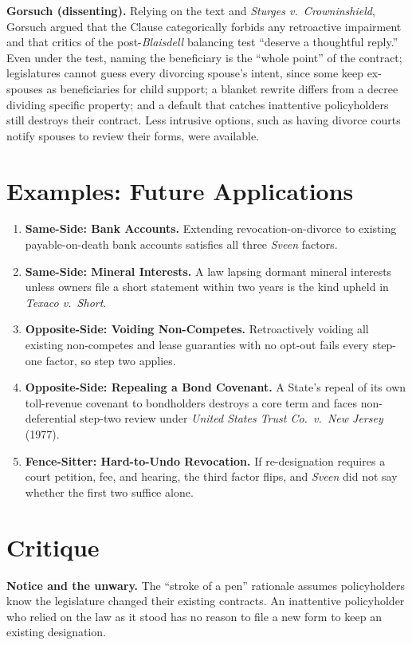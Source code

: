 \documentclass[12pt]{article}
\begin{document}
\textbf{Gorsuch (dissenting).} Relying on the text and \textit{Sturges v.\ Crowninshield}, Gorsuch argued that the Clause categorically forbids any retroactive impairment and that critics of the post-\textit{Blaisdell} balancing test ``deserve a thoughtful reply.'' Even under the test, naming the beneficiary is the ``whole point'' of the contract; legislatures cannot guess every divorcing spouse's intent, since some keep ex-spouses as beneficiaries for child support; a blanket rewrite differs from a decree dividing specific property; and a default that catches inattentive policyholders still destroys their contract. Less intrusive options, such as having divorce courts notify spouses to review their forms, were available.

\section{Examples: Future Applications}

\begin{enumerate}
\item \textbf{Same-Side: Bank Accounts.} Extending revocation-on-divorce to existing payable-on-death bank accounts satisfies all three \textit{Sveen} factors.
\item \textbf{Same-Side: Mineral Interests.} A law lapsing dormant mineral interests unless owners file a short statement within two years is the kind upheld in \textit{Texaco v.\ Short}.
\item \textbf{Opposite-Side: Voiding Non-Competes.} Retroactively voiding all existing non-competes and lease guaranties with no opt-out fails every step-one factor, so step two applies.
\item \textbf{Opposite-Side: Repealing a Bond Covenant.} A State's repeal of its own toll-revenue covenant to bondholders destroys a core term and faces non-deferential step-two review under \textit{United States Trust Co.\ v.\ New Jersey} (1977).
\item \textbf{Fence-Sitter: Hard-to-Undo Revocation.} If re-designation requires a court petition, fee, and hearing, the third factor flips, and \textit{Sveen} did not say whether the first two suffice alone.
\end{enumerate}

\section{Critique}

\textbf{Notice and the unwary.} The ``stroke of a pen'' rationale assumes policyholders know the legislature changed their existing contracts. An inattentive policyholder who relied on the law as it stood has no reason to file a new form to keep an existing designation.
\end{document}
